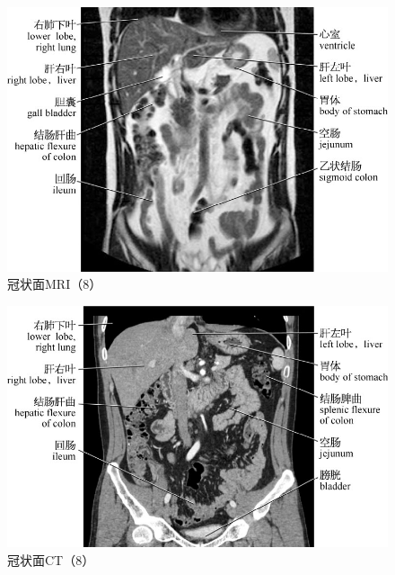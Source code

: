 \begin{figure}[!htbp]
 \centering
 \includegraphics{./images/Image00113.jpg}
 \captionsetup{justification=centering}
 \caption{冠状面MRI（8）}
  \end{figure} 
 \FloatBarrier

\begin{figure}[!htbp]
 \centering
 \includegraphics{./images/Image00114.jpg}
 \captionsetup{justification=centering}
 \caption{冠状面CT（8）}
  \end{figure} 
 \FloatBarrier

